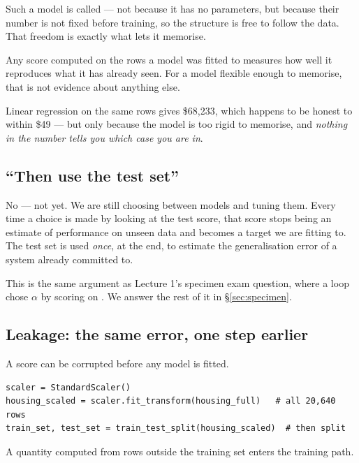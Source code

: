 \documentclass[11pt,a4paper]{article}
\begin{document}
Such a model is called  --- not because it has no
parameters, but because their number is not fixed before training, so the
structure is free to follow the data. That freedom is exactly what lets it
memorise.

\begin{failbox}[title={Failure condition --- a score computed on the rows it was fitted to}]
Any score computed on the rows a model was fitted to measures how well it
reproduces what it has already seen. For a model flexible enough to memorise,
that is not evidence about anything else.

Linear regression on the same rows gives \$68{,}233, which happens to be honest
to within \$49 --- but only because the model is too rigid to memorise, and
\emph{nothing in the number tells you which case you are in}.
\end{failbox}

\subsection{``Then use the test set''}

No --- not yet. We are still choosing between models and tuning them. Every
time a choice is made by looking at the test score, that score stops being an
estimate of performance on unseen data and becomes a target we are fitting to.
The test set is used \emph{once}, at the end, to estimate the generalisation
error of a system already committed to.

This is the same argument as Lecture 1's specimen exam question, where a loop
chose $\alpha$ by scoring on . We answer the rest of it in
\S\ref{sec:specimen}.

\subsection{Leakage: the same error, one step earlier}

A score can be corrupted before any model is fitted.

\begin{center}
\small
\begin{verbatim}
scaler = StandardScaler()
housing_scaled = scaler.fit_transform(housing_full)   # all 20,640 rows
train_set, test_set = train_test_split(housing_scaled)  # then split
\end{verbatim}
\end{center}

\begin{definition}
A quantity computed from rows outside the training set enters the training
path.
\end{definition}
\end{document}
